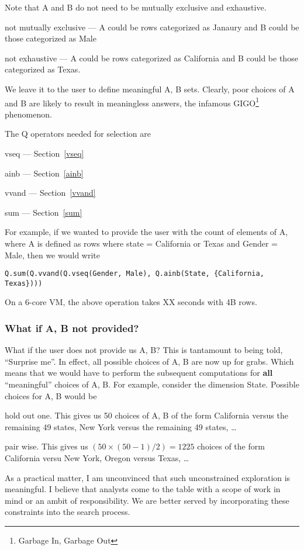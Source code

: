 Note that A and B do not need to be mutually exclusive and exhaustive. 
\bi
\item not mutually exclusive --- 
A could be rows categorized as Janaury and B could be those
categorized as Male
\item not exhaustive  ---
A could be rows categorized as California and B could be those
categorized as Texas. 
\ei

We leave it to the user to define meaningful A, B sets.
Clearly, poor choices of A and B are likely to result in meaningless
answers, the infamous GIGO\footnote{Garbage In, Garbage Out} phenomenon.

The Q operators needed for selection are 
\be
\item vseq --- Section~\ref{vseq}
\item ainb --- Section~\ref{ainb}
\item vvand --- Section~\ref{vvand}
\item sum --- Section~\ref{sum}
\ee

For example, if we wanted to provide the user with the count of elements of A,
where A is defined as rows where state = California or Texas and Gender = Male,
then we would write
\begin{verbatim}
Q.sum(Q.vvand(Q.vseq(Gender, Male), Q.ainb(State, {California, Texas})))
\end{verbatim}
On a 6-core VM, the above operation takes XX seconds with 4B rows.

\subsubsection{What if A, B not provided?}

What if the user does not provide us A, B? This is tantamount to being told,
``Surprise me''. In effect, all possible choices of A, B are now up for grabs.
Which means that we would have to perform the subsequent computations for {\bf
all} ``meaningful'' choices of A, B. For example, consider the dimension State.
Possible choices for A, B would be
\be 
\item  hold out one. This gives us 50 choices of A, B of the form California
versus the remaining 49 states, New York versus the remaining 49 states, \ldots
\item pair wise. This gives us \((50 \times (50-1)/2) = 1225\) choices of the
form California versu New York, Oregon versus Texas, \ldots
\ee

As a practical matter, I am unconvinced that such unconstrained exploration is
meaningful. I believe that analysts come to the table with a scope of work in
mind or an ambit of responsibility. We are better served by incorporating these
constraints into the search process.



